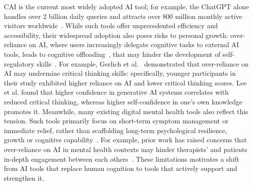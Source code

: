 \documentclass[manuscript,screen,review]{acmart}
\begin{document}
CAI is the current most widely adopted AI tool; for example, the ChatGPT alone handles over 2 billion daily queries and attracts over 800 million monthly active visitors worldwide~\cite{demandsage_chatgpt_stats}. 
While such tools offer unprecedented efficiency and accessibility, their widespread adoption also poses risks to personal growth: over-reliance on AI, where users increasingly delegate cognitive tasks to external AI tools, leads to cognitive offloading~\cite{Risko2016, sparrow2011google}, that may hinder the development of self-regulatory skills~\cite{yourbrainongpt25, Gerlich_2025}.
For example, Gerlich et al.~\cite{Gerlich_2025} demonstrated that over-reliance on AI may undermine critical thinking skills: specifically, younger participants in their study exhibited higher reliance on AI and lower critical thinking scores.
Lee et al. \cite{lee2025the} found that higher confidence in generative AI systems correlates with reduced critical thinking, whereas higher self-confidence in one’s own knowledge promotes it.
Meanwhile, many existing digital mental health tools also reflect this tension. 
Such tools primarily focus on short-term symptom management or immediate relief, rather than scaffolding long-term psychological resilience, growth or cognitive capability~\cite{guo2024large, zohar2024an}. 
For example, prior work has raised concerns that over-reliance on AI in mental health contexts may hinder therapists’ and patients in-depth engagement between each others~\cite{ zohar2024an}.
These limitations motivates a shift from AI tools that replace human cognition to tools that actively support and strengthen it. 
\end{document}
